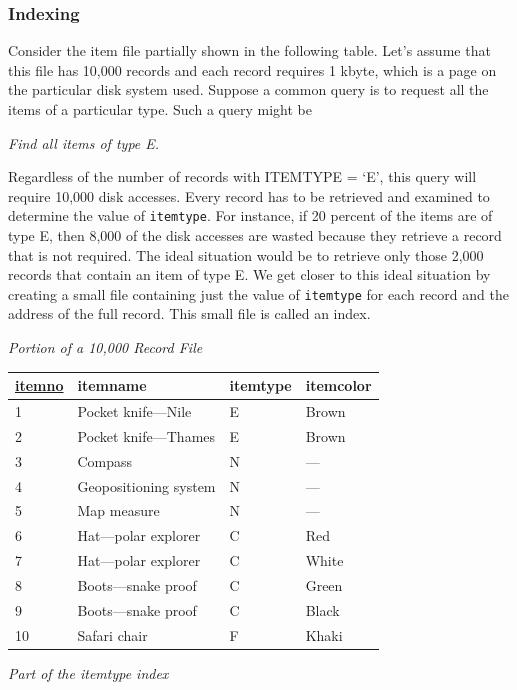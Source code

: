 \documentclass[
]{article}
\begin{document}
\hypertarget{indexing}{%
\subsubsection*{Indexing}\label{indexing}}

Consider the item file partially shown in the following table. Let's
assume that this file has 10,000 records and each record requires 1
kbyte, which is a page on the particular disk system used. Suppose a
common query is to request all the items of a particular type. Such a
query might be

\emph{Find all items of type E.}

Regardless of the number of records with ITEMTYPE = `E', this query will
require 10,000 disk accesses. Every record has to be retrieved and
examined to determine the value of \texttt{itemtype}. For instance, if 20
percent of the items are of type E, then 8,000 of the disk accesses are
wasted because they retrieve a record that is not required. The ideal
situation would be to retrieve only those 2,000 records that contain an
item of type E. We get closer to this ideal situation by creating a
small file containing just the value of \texttt{itemtype} for each record and
the address of the full record. This small file is called an index.

\emph{Portion of a 10,000 Record File}

\begin{longtable}[]{@{}llll@{}}
\toprule
\underline{itemno} & itemname & itemtype & itemcolor \\
\midrule
\endhead
1 & Pocket knife---Nile & E & Brown \\
2 & Pocket knife---Thames & E & Brown \\
3 & Compass & N & --- \\
4 & Geopositioning system & N & --- \\
5 & Map measure & N & --- \\
6 & Hat---polar explorer & C & Red \\
7 & Hat---polar explorer & C & White \\
8 & Boots---snake proof & C & Green \\
9 & Boots---snake proof & C & Black \\
10 & Safari chair & F & Khaki \\
\bottomrule
\end{longtable}

\emph{Part of the itemtype index}
\end{document}
